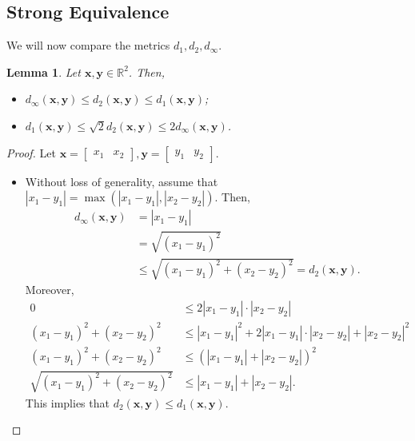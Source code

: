 \documentclass[a4paper, openany]{memoir}
\theoremstyle{definition}
\theoremstyle{plain}
\newtheorem{lemma}[definition]{Lemma}
\begin{document}
\subsection{Strong Equivalence}
We will now compare the metrics $d_1, d_2, d_\infty$.
\begin{lemma}
Let $\bm{x}, \bm{y} \in \mathbb{R}^2$. Then,
\begin{itemize}
    \item $d_\infty(\bm{x}, \bm{y}) \leqslant d_2(\bm{x}, \bm{y}) \leqslant d_1(\bm{x}, \bm{y})$;
    \item $d_1(\bm{x}, \bm{y}) \leqslant \sqrt{2} d_2(\bm{x}, \bm{y}) \leqslant 2 d_\infty(\bm{x}, \bm{y})$.
\end{itemize}
\end{lemma}
\begin{proof}
    Let $\bm{x} = \begin{bmatrix}
        x_1 & x_2
    \end{bmatrix}, \bm{y} = \begin{bmatrix}
        y_1 & y_2
    \end{bmatrix}$.
\begin{itemize}
    \item Without loss of generality, assume that $|x_1 - y_1| = \max(|x_1 - y_1|, |x_2 - y_2|)$. Then,
    \begin{align*}
        d_\infty(\bm{x}, \bm{y}) &= |x_1 - y_1| \\
        &= \sqrt{(x_1 - y_1)^2} \\
        &\leqslant \sqrt{(x_1 - y_1)^2 + (x_2 - y_2)^2} = d_2(\bm{x}, \bm{y}).
    \end{align*}
    Moreover,
    \begin{align*}
        0 &\leqslant 2 |x_1 - y_1| \cdot |x_2 - y_2| \\
        (x_1 - y_1)^2 + (x_2 - y_2)^2 &\leqslant |x_1 - y_1|^2 + 2|x_1 - y_1| \cdot |x_2 - y_2| + |x_2 - y_2|^2 \\
        (x_1 - y_1)^2 + (x_2 - y_2)^2 &\leqslant (|x_1 - y_1| + |x_2 - y_2|)^2 \\
        \sqrt{(x_1 - y_1)^2 + (x_2 - y_2)^2} &\leqslant |x_1 - y_1| + |x_2 - y_2|.
    \end{align*}
    This implies that $d_2(\bm{x}, \bm{y}) \leqslant d_1(\bm{x}, \bm{y})$.
    

\end{itemize}
\end{proof}
\end{document}
